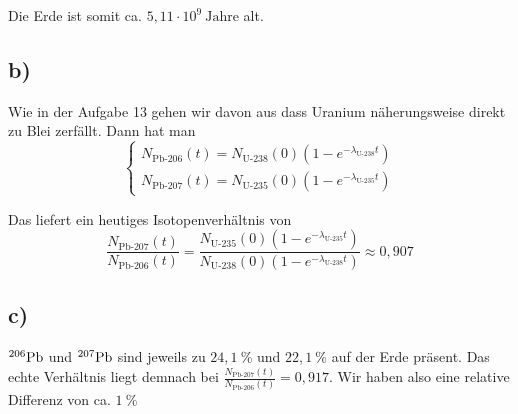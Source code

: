 \documentclass[12pt]{article}
\begin{document}
Die Erde ist somit ca. $5,11 \cdot 10^9 \ \text{Jahre}$ alt.

\subsection{b)}

Wie in der Aufgabe 13 gehen wir davon aus dass Uranium näherungsweise direkt zu Blei zerfällt. Dann hat man
\begin{equation*}
    \begin{cases}
        N_\text{Pb-206}(t) = N_\text{U-238}(0)(1-e^{-\lambda_\text{U-238} t}) \\
        N_\text{Pb-207}(t) = N_\text{U-235}(0)(1-e^{-\lambda_\text{U-235} t})
\end{cases}
\end{equation*}


Das liefert ein heutiges Isotopenverhältnis von
\begin{equation*}
    \frac{N_\text{Pb-207}(t)}{N_\text{Pb-206}(t)} = \frac{N_\text{U-235}(0)(1-e^{-\lambda_\text{U-235} t})}{N_\text{U-238}(0)(1-e^{-\lambda_\text{U-238} t})} \approx 0,907
\end{equation*}

\subsection{c)}

$^{206} \ce{Pb}$ und $^{207} \ce{Pb}$ sind jeweils zu $24,1 \ \%$ und $22,1 \ \%$ auf der Erde präsent. Das echte Verhältnis liegt demnach bei $\frac{N_\text{Pb-207}(t)}{N_\text{Pb-206}(t)} = 0,917$. Wir haben also eine relative Differenz von ca. $1 \ \%$
\end{document}
